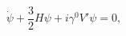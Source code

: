 \begin{equation}\label{eq:FRWDirac}
  \dot{\psi}+\frac{3}{2}H \psi+i \gamma^0 V' \psi=0,
\end{equation}

